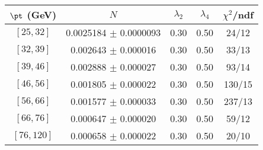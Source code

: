\begin{tabular}{c||c|c|c|c}
$\pt$ (GeV) & $N$ & $\lambda_{2}$ & $\lambda_4$  & $\chi^2$/ndf  \\
\hline
$[25, 32]$ & 0.0025184 $\pm$ 0.0000093 & 0.30 & 0.50 & 24/12\\
$[32, 39]$ & 0.002643 $\pm$ 0.000016 & 0.30 & 0.50 & 33/13\\
$[39, 46]$ & 0.002888 $\pm$ 0.000027 & 0.30 & 0.50 & 93/14\\
$[46, 56]$ & 0.001805 $\pm$ 0.000022 & 0.30 & 0.50 & 130/15\\
$[56, 66]$ & 0.001577 $\pm$ 0.000033 & 0.30 & 0.50 & 237/13\\
$[66, 76]$ & 0.000647 $\pm$ 0.000020 & 0.30 & 0.50 & 59/12\\
$[76, 120]$ & 0.000658 $\pm$ 0.000022 & 0.30 & 0.50 & 20/10\\
\end{tabular}

